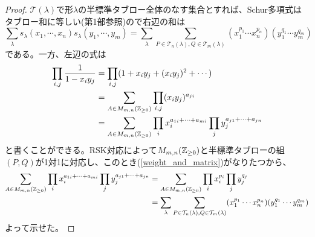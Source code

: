 \documentclass{ltjsreport}
\begin{document}
\begin{proof}
  $\mathcal{T}(\lambda)$で形$\lambda$の半標準タブロー全体のなす集合とすれば、Schur多項式はタブロー和に等しい(第1部参照)ので右辺の和は
  \[
  \sum_{\lambda}s_\lambda(x_1,\cdots,x_n)s_\lambda(y_1,\cdots,y_m)
  =\sum_{\lambda}
  \sum_{P\in\mathcal{T}_n(\lambda),Q\in\mathcal{T}_m(\lambda)}
  (x_1^{p_1}\cdots x_n^{p_n})(y_1^{q_1}\cdots y_m^{q_m})
  \]
  である。一方、左辺の式は
  \begin{align*}
  \prod_{i,j}\frac{1}{1-x_iy_j}&=\prod_{i,j}(1+x_iy_j+(x_iy_j)^2+\cdots)\\
  &=\sum_{A\in M_{m,n}(\mathbb{Z}_{\geq 0})}\prod_{i,j}(x_iy_j)^{a_{ji}}\\
  &=\sum_{A\in M_{m,n}(\mathbb{Z}_{\geq 0})}\prod_i x_i^{a_{1i}+\cdots+a_{mi}}\prod_j y_j^{a_{j1}+\cdots+a_{jn}}
  \end{align*}
  と書くことができる。RSK対応によって$M_{m,n}(\mathbb{Z}_{\geq 0})$と半標準タブローの組$(P,Q)$が1対1に対応し、このとき(\ref{weight_and_matrix})がなりたつから、
  \begin{align*}
    \sum_{A\in M_{m,n}(\mathbb{Z}_{\geq 0})}\prod_i x_i^{a_{1i}+\cdots+a_{mi}}\prod_j y_j^{a_{j1}+\cdots+a_{jn}}
    &=\sum_{A\in M_{m,n}(\mathbb{Z}_{\geq 0})}\prod_i x_i^{p_i}\prod_j y_j^{q_j}\\
    &=\sum_{\lambda}
    \sum_{P\in\mathcal{T}_n(\lambda),Q\in\mathcal{T}_m(\lambda)}
    (x_1^{p_1}\cdots x_n^{p_n})(y_1^{q_1}\cdots y_m^{q_m})
  \end{align*}
  よって示せた。
\end{proof}
\end{document}
